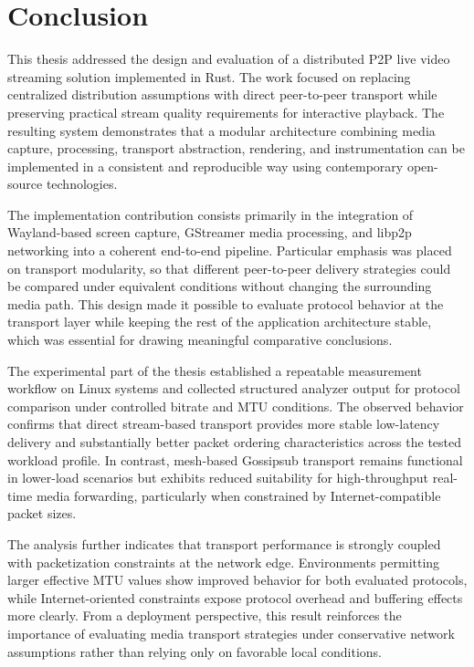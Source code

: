 \section{Conclusion}
This thesis addressed the design and evaluation of a distributed \ac{P2P} live video streaming solution implemented in Rust. The work focused on replacing centralized distribution assumptions with direct peer-to-peer transport while preserving practical stream quality requirements for interactive playback. The resulting system demonstrates that a modular architecture combining media capture, processing, transport abstraction, rendering, and instrumentation can be implemented in a consistent and reproducible way using contemporary open-source technologies.

The implementation contribution consists primarily in the integration of Wayland-based screen capture, GStreamer media processing, and libp2p networking into a coherent end-to-end pipeline. Particular emphasis was placed on transport modularity, so that different peer-to-peer delivery strategies could be compared under equivalent conditions without changing the surrounding media path. This design made it possible to evaluate protocol behavior at the transport layer while keeping the rest of the application architecture stable, which was essential for drawing meaningful comparative conclusions.

The experimental part of the thesis established a repeatable measurement workflow on Linux systems and collected structured analyzer output for protocol comparison under controlled bitrate and \ac{MTU} conditions. The observed behavior confirms that direct stream-based transport provides more stable low-latency delivery and substantially better packet ordering characteristics across the tested workload profile. In contrast, mesh-based Gossipsub transport remains functional in lower-load scenarios but exhibits reduced suitability for high-throughput real-time media forwarding, particularly when constrained by Internet-compatible packet sizes.

The analysis further indicates that transport performance is strongly coupled with packetization constraints at the network edge. Environments permitting larger effective \ac{MTU} values show improved behavior for both evaluated protocols, while Internet-oriented constraints expose protocol overhead and buffering effects more clearly. From a deployment perspective, this result reinforces the importance of evaluating media transport strategies under conservative network assumptions rather than relying only on favorable local conditions.

